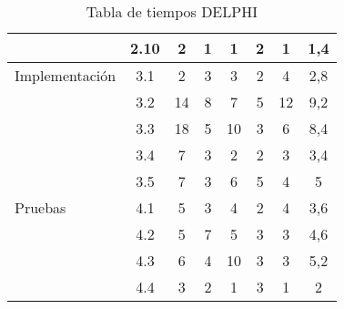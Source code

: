 \documentclass[11pt,a4paper,spanish,twoside]{report}
\begin{document}
\begin{table}[!h]
\begin{tabular}{|p{2.5cm}|c|c|c|c|c|c|c|}
    \cline{2-8}
    & 2.10 & 2 & 1 & 1 & 2 & 1 & 1,4\\
    \hline
    Implementación & 3.1 & 2 & 3 & 3 & 2 & 4 & 2,8\\
    \cline{2-8}
    & 3.2 & 14 & 8 & 7 & 5 & 12 & 9,2\\
    \cline{2-8}
    & 3.3 & 18 & 5 & 10 & 3 & 6 & 8,4\\
    \cline{2-8}
    & 3.4 & 7 & 3 & 2 & 2 & 3 & 3,4\\
    \cline{2-8}
    & 3.5 & 7 & 3 & 6 & 5 & 4 & 5\\
    \hline
    Pruebas & 4.1 & 5 & 3 & 4 & 2 & 4 & 3,6\\
    \cline{2-8}
    & 4.2 & 5 & 7 & 5 & 3 & 3 & 4,6\\
    \cline{2-8}
    & 4.3 & 6 & 4 & 10 & 3 & 3 & 5,2\\
    \cline{2-8}
    & 4.4 & 3 & 2 & 1 & 3 & 1 & 2\\
    \hline
  \end{tabular}
  \caption{Tabla de tiempos DELPHI} \label{Tab:delphi}
\end{table}
\end{document}
